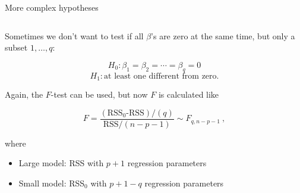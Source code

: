 \documentclass[10pt,ignorenonframetext,]{beamer}
\providecommand{\tightlist}{%
  \setlength{\itemsep}{0pt}\setlength{\parskip}{0pt}}
\begin{document}
\begin{frame}

\begin{block}{More complex hypotheses}

\(~\)

Sometimes we don't want to test if all \(\beta\)'s are zero at the same
time, but only a subset \(1,\ldots , q\):

\[ H_0: \beta_1=\beta_2=\cdots= \beta_q =0\] 
\[H_1: \text{at least one different from zero}.\]

\vspace{2mm}

Again, the \(F\)-test can be used, but now \(F\) is calculated like

\[F=\frac{(\text{RSS$_0$-RSS})/(q)}{\text{RSS}/(n-p-1)} \sim F_{q,n-p-1} \ ,\]

where

\begin{itemize}
\tightlist
\item
  Large model: RSS with \(p+1\) regression parameters
\item
  Small model: RSS\(_0\) with \(p+1-q\) regression parameters
\end{itemize}

\end{block}

\end{frame}
\end{document}
